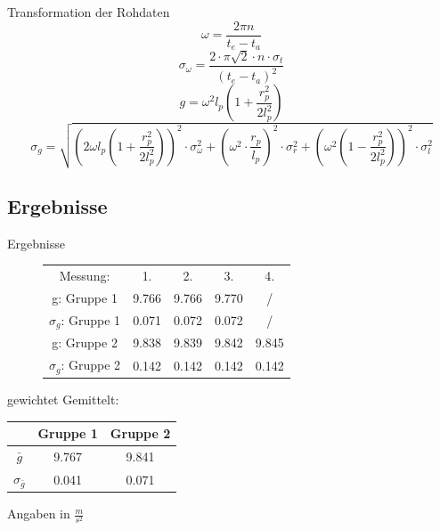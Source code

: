 \documentclass[11pt]{beamer}
\begin{document}
\begin{frame}{Transformation der Rohdaten}
\begin{equation*}
\omega=\frac{2\pi n}{t_e-t_a}
\end{equation*}
\begin{equation*}
\sigma_{\omega}=\frac{2\cdot \pi \sqrt{2}\cdot n \cdot \sigma_t}{(t_e-t_a)^2}
\end{equation*}
\begin{equation*}
g=\omega^2 l_p (1+\frac{r_p^2}{2 l_p^2}) 
\end{equation*}
\begin{equation*}
\sigma_g=\sqrt{(2\omega l_p (1+\frac{r_p^2}{2 l_p^2}))^2 \cdot \sigma_{\omega}^2+(\omega^2 \cdot \frac{r_p}{l_p})^2 \cdot \sigma_r^2+(\omega^2(1-\frac{r_p^2}{2 l_p^2}))^2 \cdot \sigma_l^2} 
\end{equation*}
\end{frame}

\subsection{Ergebnisse}
\begin{frame}{Ergebnisse}
\begin{figure}[H]\centering
\begin{tabular}{c|c|c|c|c}
Messung: & 1. & 2. & 3. & 4. \\ 
g: Gruppe 1 & 9.766 & 9.766 & 9.770 & / \\ 
$\sigma_g$: Gruppe 1 & 0.071 & 0.072 & 0.072 & / \\ 
g: Gruppe 2 & 9.838 & 9.839 & 9.842 & 9.845 \\ 
$\sigma_g$: Gruppe 2 & 0.142 & 0.142 & 0.142 & 0.142 \\ 
\end{tabular} 
\newline
\newline
\end{figure}
gewichtet Gemittelt:
\begin{center}
\begin{tabular}{c|c|c}
 & Gruppe 1 & Gruppe 2 \\ 
\hline 
$\bar{g}$ & 9.767 & 9.841 \\ 
$\sigma_{\bar{g}}$ & 0.041 & 0.071 \\ 
\end{tabular} 
\newline
\newline
Angaben in $\frac{m}{s^2}$
\end{center}
\end{frame}
\end{document}
